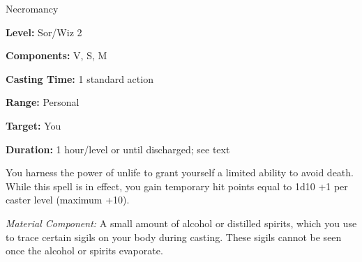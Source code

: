 
Necromancy

\textbf{Level:} Sor/Wiz 2

\textbf{Components:} V, S, M

\textbf{Casting Time:} 1 standard action

\textbf{Range:} Personal

\textbf{Target:} You

\textbf{Duration:} 1 hour/level or until discharged; see text

You harness the power of unlife to grant yourself a limited ability to avoid death. 
While this spell is in effect, you gain temporary hit points equal to 1d10 +1 per 
caster level (maximum +10).

\textit{Material Component:} A small amount of alcohol or distilled spirits, which 
you use to trace certain sigils on your body during casting. These sigils cannot 
be seen once the alcohol or spirits evaporate.

